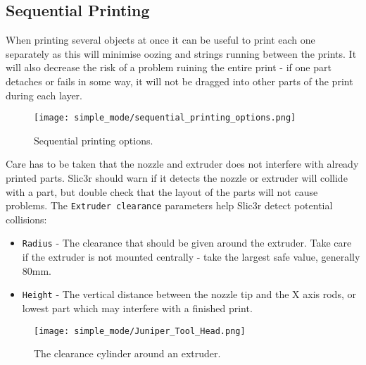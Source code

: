 
\subsection{Sequential Printing} %
\label{sec:sequential_printing}

When printing several objects at once it can be useful to print each one separately as this will minimise oozing and strings running between the prints.  It will also decrease the risk of a problem ruining the entire print - if one part detaches or fails in some way, it will not be dragged into other parts of the print during each layer.

\begin{figure}[H]
\centering
\texttt{[image: simple\_mode/sequential\_printing\_options.png]}
\caption{Sequential printing options.}
\label{fig:sequential_printing_options}
\end{figure}

Care has to be taken that the nozzle and extruder does not interfere with already printed parts.  Slic3r should warn if it detects the nozzle or extruder will collide with a part, but double check that the layout of the parts will not cause problems.  The \texttt{Extruder clearance} parameters help Slic3r detect potential collisions:
\begin{itemize}
	\item \texttt{Radius}  - The clearance that should be given around the extruder.  Take care if the extruder is not mounted centrally - take the largest safe value, generally 80mm.
	\item \texttt{Height}  - The vertical distance between the nozzle tip and the X axis rods, or lowest part which may interfere with a finished print.
\end{itemize}

\begin{figure}[H]
\centering
\texttt{[image: simple\_mode/Juniper\_Tool\_Head.png]}
\caption{The clearance cylinder around an extruder.}
\label{fig:a_diagram_depicting_extruder_clearance}
\end{figure}

